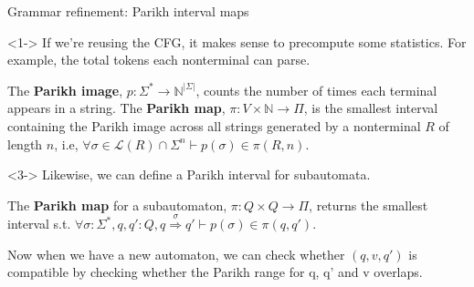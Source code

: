 \documentclass{beamer}
\begin{document}
\begin{frame}[t,fragile]{Grammar refinement: Parikh interval maps}
  \begin{onlyenv}<1->
  If we’re reusing the CFG, it makes sense to precompute some statistics. For example, the total tokens each nonterminal can parse.


  \begin{definition}
    The \textbf{Parikh image}, $p: \Sigma^* \rightarrow \mathbb{N}^{|\Sigma|}$, counts the number of times each terminal appears in a string. The \textbf{Parikh map}, $\pi: V \times \mathbb{N} \rightarrow \Pi$, is the smallest interval containing the Parikh image across all strings generated by a nonterminal $R$ of length $n$, i.e, $\forall \sigma \in \mathcal{L}(R) \cap \Sigma^n \vdash p(\sigma) \in \pi(R, n)$.
  \end{definition}
  \end{onlyenv}

  \begin{onlyenv}<3->
  Likewise, we can define a Parikh interval for subautomata.

  \begin{definition}
    The \textbf{Parikh map} for a subautomaton, $\pi: Q \times Q \rightarrow \Pi$, returns the smallest interval s.t. $\forall \sigma: \Sigma^*, q, q': Q, q \overset{\sigma}{\Longrightarrow} q' \vdash p(\sigma) \in \pi(q, q')$.
  \end{definition}


  Now when we have a new automaton, we can check whether $(q, v, q')$ is compatible by checking whether the Parikh range for q, q’ and v overlaps.\\\vspace{0.5cm}

  \end{onlyenv}
\end{frame}
\end{document}
